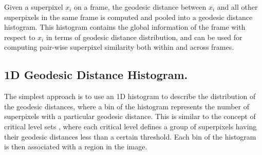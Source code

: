 \documentclass[runningheads]{llncs}
\begin{document}
Given a superpixel $x_i$ on a frame, the geodesic distance between $x_i$ and all other superpixels in the same frame is computed and pooled into a geodesic distance histogram. This histogram contains the global information of the frame with respect to $x_i$ in terms of geodesic distance distribution, and can be used for computing pair-wise superpixel similarity both within and across frames. 





\label{sec:HF}
\subsection{1D Geodesic Distance Histogram.}
The simplest approach is to use an 1D histogram to describe the distribution of the geodesic distances, where a bin of the histogram represents the number of superpixels with a particular geodesic distance. This is similar to the concept of critical level sets \cite{Krähenbühl2014}, where each critical level defines a group of superpixels having their geodesic distances less than a certain threshold. Each bin of the histogram is then associated with a region in the image.
\end{document}

